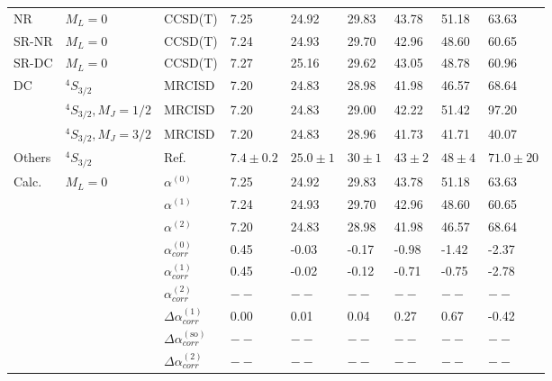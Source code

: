 \begin{longtable}{lllllllll}
\bottomrule
\endlastfoot
NR & $M_L=0$ & CCSD(T) &         7.25 &       24.92 &     29.83 &     43.78 &     51.18 &        63.63 \\
SR-NR & $M_L=0$ & CCSD(T) &         7.24 &       24.93 &     29.70 &     42.96 &     48.60 &        60.65 \\
SR-DC & $M_L=0$ & CCSD(T) &         7.27 &       25.16 &     29.62 &     43.05 &     48.78 &        60.96 \\
DC & $^4S_{3/2}$ & MRCISD &         7.20 &       24.83 &     28.98 &     41.98 &     46.57 &        68.64 \\
      & $^4S_{3/2}, M_J=1/2$ & MRCISD &         7.20 &       24.83 &     29.00 &     42.22 &     51.42 &        97.20 \\
      & $^4S_{3/2}, M_J=3/2$ & MRCISD &         7.20 &       24.83 &     28.96 &     41.73 &     41.71 &        40.07 \\
Others & $^4S_{3/2}$ & Ref. \cite{Schwerdtfeger2019} &  $7.4\pm0.2$ &  $25.0\pm1$ &  $30\pm1$ &  $43\pm2$ &  $48\pm4$ &  $71.0\pm20$ \\
Calc. & $M_L=0$ & $\alpha^{(0)}$ &         7.25 &       24.92 &     29.83 &     43.78 &     51.18 &        63.63 \\
      &         & $\alpha^{(1)}$ &         7.24 &       24.93 &     29.70 &     42.96 &     48.60 &        60.65 \\
      &         & $\alpha^{(2)}$ &         7.20 &       24.83 &     28.98 &     41.98 &     46.57 &        68.64 \\
      &         & $\alpha_{corr}^{(0)}$ &         0.45 &       -0.03 &     -0.17 &     -0.98 &     -1.42 &        -2.37 \\
      &         & $\alpha_{corr}^{(1)}$ &         0.45 &       -0.02 &     -0.12 &     -0.71 &     -0.75 &        -2.78 \\
      &         & $\alpha_{corr}^{(2)}$ &          $--$ &         $--$ &       $--$ &       $--$ &       $--$ &          $--$ \\
      &         & $\Delta \alpha_{corr}^{(\text{1})}$ &         0.00 &        0.01 &      0.04 &      0.27 &      0.67 &        -0.42 \\
      &         & $\Delta \alpha_{corr}^{(\text{so})}$ &          $--$ &         $--$ &       $--$ &       $--$ &       $--$ &          $--$ \\
      &         & $\Delta \alpha_{corr}^{(\text{2})}$ &          $--$ &         $--$ &       $--$ &       $--$ &       $--$ &          $--$ \\

\end{longtable}
